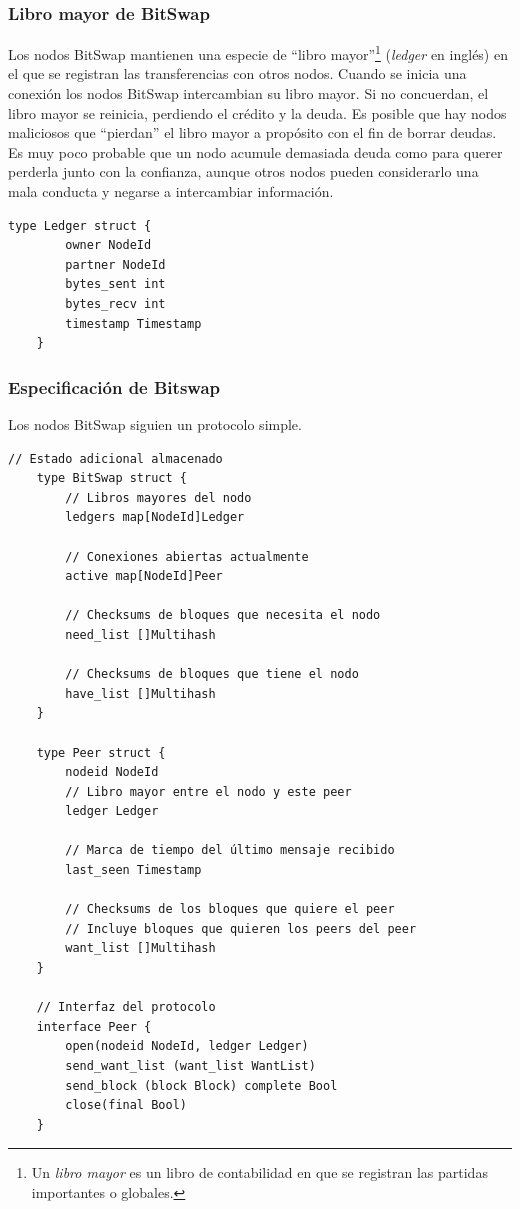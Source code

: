 \documentclass[12pt]{article} %
\begin{document}

\subsubsection{Libro mayor de BitSwap} %
\label{ssub:libro_mayor_de_bitswap}

Los nodos BitSwap mantienen una especie de ``libro mayor''\footnote{Un \textit{libro mayor} es un libro de contabilidad en que se registran las partidas importantes o globales.} (\textit{ledger} en inglés) en el que se registran las transferencias con otros nodos. Cuando se inicia una conexión los nodos BitSwap intercambian su libro mayor. Si no concuerdan, el libro mayor se reinicia, perdiendo el crédito y la deuda. Es posible que hay nodos maliciosos que ``pierdan'' el libro mayor a propósito con el fin de borrar deudas. Es muy poco probable que un nodo acumule demasiada deuda como para querer perderla junto con la confianza, aunque otros nodos pueden considerarlo una mala conducta y negarse a intercambiar información.

\begin{lstlisting}[caption={Implementación del libro mayor.}, language=Golang]
	type Ledger struct {
		owner NodeId
		partner NodeId
		bytes_sent int
		bytes_recv int
		timestamp Timestamp
	}
\end{lstlisting}


\subsubsection{Especificación de Bitswap} %
\label{ssub:especificación_de_bitswap}

Los nodos BitSwap siguien un protocolo simple.

\begin{lstlisting}[caption={Implementación del protocolo BitSwap}, language=Golang]
	// Estado adicional almacenado
	type BitSwap struct {
		// Libros mayores del nodo
		ledgers map[NodeId]Ledger

		// Conexiones abiertas actualmente
		active map[NodeId]Peer

		// Checksums de bloques que necesita el nodo
		need_list []Multihash

		// Checksums de bloques que tiene el nodo
		have_list []Multihash
	}

	type Peer struct {
		nodeid NodeId
		// Libro mayor entre el nodo y este peer
		ledger Ledger

		// Marca de tiempo del último mensaje recibido
		last_seen Timestamp

		// Checksums de los bloques que quiere el peer
		// Incluye bloques que quieren los peers del peer
		want_list []Multihash
	}

	// Interfaz del protocolo
	interface Peer {
		open(nodeid NodeId, ledger Ledger)
		send_want_list (want_list WantList)
		send_block (block Block) complete Bool
		close(final Bool)
	}
\end{lstlisting}
\end{document}
